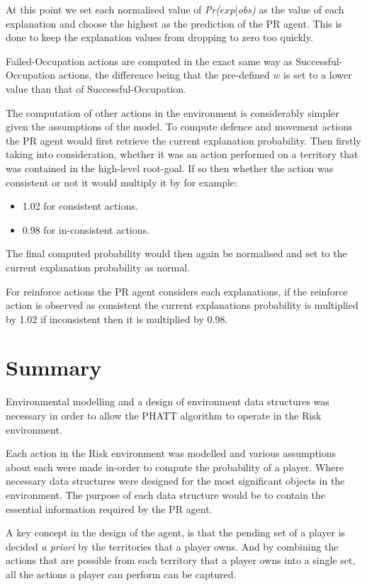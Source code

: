 \documentclass[parskip]{cs4rep}
\begin{document}
At this point we set each normalised value of \textit{Pr($exp$}|\textit{obs)} as the value of each explanation and choose the highest as the prediction of the PR agent. This is done to keep the explanation values from dropping to zero too quickly.

Failed-Occupation actions are computed in the exact same way as Successful-Occupation actions, the difference being that the pre-defined $w$ is set to a lower value than that of Successful-Occupation.

The computation of other actions in the environment is considerably simpler given the assumptions of the model. To compute defence and movement actions the PR agent would first retrieve the current explanation probability. Then firstly taking into consideration, whether it was an action performed on a territory that was contained in the high-level root-goal. If so then whether the action was consistent or not it would multiply it by for example:

\begin{itemize}
\item
1.02 for consistent actions.
\item
0.98 for in-consistent actions.
\end{itemize}

The final computed probability would then again be normalised and set to the current explanation probability as normal.

For reinforce actions the PR agent considers each explanations, if the reinforce action is observed as consistent the current explanations probability is multiplied by 1.02 if inconsistent then it is multiplied by 0.98. 

\section{Summary}

Environmental modelling and a design of environment data structures was necessary in order to allow the PHATT algorithm to operate in the Risk environment. 

Each action in the Risk environment was modelled and various assumptions about each were made in-order to compute the probability of a player. Where necessary data structures were designed for the most significant objects in the environment. The purpose of each data structure would be to contain the essential information required by the PR agent.

A key concept in the design of the agent, is that the pending set of a player is decided \textit{a priori} by the territories that a player owns. And by combining the actions that are possible from each territory that a player owns into a single set, all the actions a player can perform can be captured.
\end{document}
